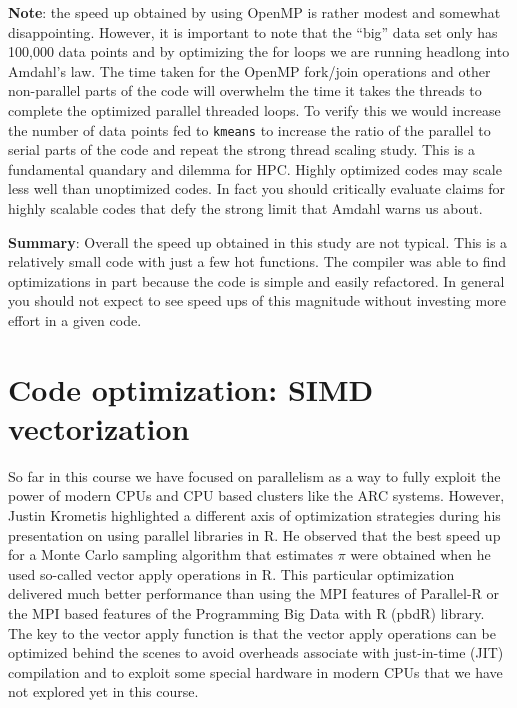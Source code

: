  {\bf Note}: the speed up obtained by using OpenMP is rather modest and somewhat disappointing. However, it is important to note that the ``big'' data set only has 100,000 data points and by optimizing the for loops we are running headlong into Amdahl's law. The time taken for the OpenMP fork/join operations and other non-parallel parts of the code will overwhelm the time it takes the threads to complete the optimized parallel threaded loops. To verify this we would increase the number of data points fed to \texttt{kmeans} to increase the ratio of the parallel to serial parts of the code and repeat the strong thread scaling study. This is a fundamental quandary and dilemma for HPC. Highly optimized codes may scale less well than unoptimized codes. In fact you should critically evaluate claims for highly scalable codes that defy the strong limit that Amdahl warns us about.

{\bf Summary}: Overall the speed up obtained in this study are not typical. This is a relatively small code with just a few hot functions. The compiler was able to find optimizations in part because the code is simple and easily refactored. In general you should not expect to see speed ups of this magnitude without investing more effort in a given code.

\iffalse

\newpage
\section{Code optimization: SIMD vectorization}

So far in this course we have focused on parallelism as a way to fully exploit the power of modern CPUs and CPU based clusters like the ARC systems. However, Justin Krometis highlighted a different axis of optimization strategies during his presentation on using parallel libraries in R. He observed that the best speed up for a Monte Carlo sampling algorithm that estimates $\pi$ were obtained when he used so-called vector apply operations in R. This particular optimization delivered much better performance than using the MPI features of Parallel-R or the MPI based features of the Programming Big Data with R (pbdR) library. The key to the vector apply function is that the vector apply operations can be optimized behind the scenes to avoid overheads associate with just-in-time (JIT) compilation and to exploit some special hardware in modern CPUs that we have not explored yet in this course.

